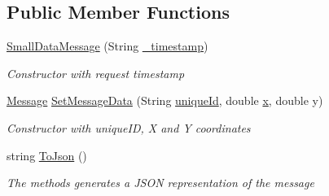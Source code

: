 \subsection*{Public Member Functions}
\begin{DoxyCompactItemize}
\item 
\hyperlink{class_web_analyzer_1_1_models_1_1_message_model_1_1_small_data_message_a6d3277a92841d1dad66fc9624440bb44}{Small\+Data\+Message} (String \hyperlink{class_web_analyzer_1_1_models_1_1_message_model_1_1_message_ae1e243f35e213e08ec2bdc54f64b0d2e}{\+\_\+timestamp})
\begin{DoxyCompactList}\small\item\em Constructor with request timestamp \end{DoxyCompactList}\item 
\hyperlink{class_web_analyzer_1_1_models_1_1_message_model_1_1_message}{Message} \hyperlink{class_web_analyzer_1_1_models_1_1_message_model_1_1_small_data_message_a561665d1d14344432438f35ad7ff8291}{Set\+Message\+Data} (String \hyperlink{_u_i_2_h_t_m_l_resources_2js_2lib_2underscore_8min_8js_af690ff5521d79c7128861033ae80ae17}{unique\+Id}, double \hyperlink{_u_i_2_h_t_m_l_resources_2js_2lib_2underscore_8min_8js_a81e910173af87b1161e719a504d52407}{x}, double y)
\begin{DoxyCompactList}\small\item\em Constructor with unique\+I\+D, X and Y coordinates \end{DoxyCompactList}\item 
string \hyperlink{class_web_analyzer_1_1_models_1_1_message_model_1_1_small_data_message_a3356382b18a26961825c50a7037e826f}{To\+Json} ()
\begin{DoxyCompactList}\small\item\em The methods generates a J\+S\+O\+N representation of the message \end{DoxyCompactList}\end{DoxyCompactItemize}
